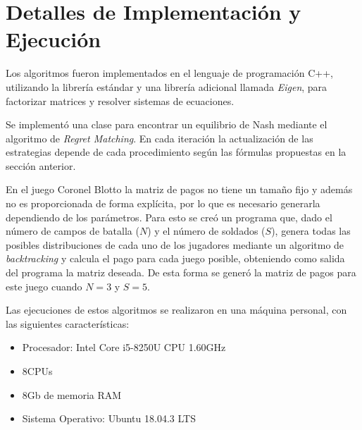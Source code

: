\section{Detalles de Implementación y Ejecución}

Los algoritmos fueron implementados en el lenguaje de programación C++, utilizando la librería estándar y una librería adicional llamada \textit{Eigen}, para factorizar matrices y resolver sistemas de ecuaciones.

Se implementó una clase para encontrar un equilibrio de Nash mediante el algoritmo de \textit{Regret Matching}. En cada iteración la actualización de las estrategias depende de cada procedimiento según las fórmulas propuestas en la sección anterior.

En el juego Coronel Blotto la matriz de pagos no tiene un tamaño fijo y además no es proporcionada de forma explícita, por lo que es necesario generarla dependiendo de los parámetros. Para esto se creó un programa que, dado el número de campos de batalla ($N$) y el número de soldados ($S$), genera todas las posibles distribuciones de cada uno de los jugadores mediante un algoritmo de \textit{backtracking} y calcula el pago para cada juego posible, obteniendo como salida del programa la matriz deseada. De esta forma se generó la matriz de pagos para este juego cuando $N = 3$ y $S = 5$.

Las ejecuciones de estos algoritmos se realizaron en una máquina personal, con las siguientes características:
\begin{itemize}[noitemsep]
    \item Procesador: Intel\textsuperscript{\textregistered} Core\textsuperscript{\texttrademark} i5-8250U CPU   1.60GHz
    \item 8CPUs
    \item 8Gb de memoria RAM
    \item Sistema Operativo: Ubuntu 18.04.3 LTS
\end{itemize}

